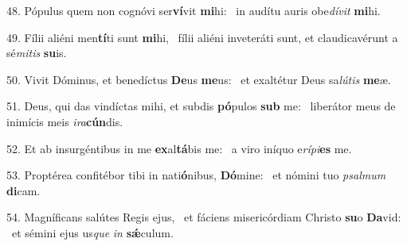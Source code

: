 48. Pópulus quem non cognóvi ser\textbf{ví}vit \textbf{mi}hi: \ast\  in audítu auris obe\textit{dí}\textit{vit} \textbf{mi}hi.\

49. Fílii aliéni men\textbf{tí}ti sunt \textbf{mi}hi, \ast\  fílii aliéni inveteráti sunt, et claudicavérunt a sé\textit{mi}\textit{tis} \textbf{su}is.\

50. Vivit Dóminus, et benedíctus \textbf{De}us \textbf{me}us: \ast\  et exaltétur Deus sa\textit{lú}\textit{tis} \textbf{me}æ.\

51. Deus, qui das vindíctas mihi, et subdis \textbf{pó}pulos \textbf{sub} me: \ast\  liberátor meus de inimícis meis \textit{i}\textit{ra}\textbf{cún}dis.\

52. Et ab insurgéntibus in me \textbf{ex}al\textbf{tá}bis me: \ast\  a viro iníquo e\textit{rí}\textit{pi}\textbf{es} me.\

53. Proptérea confitébor tibi in nati\textbf{ó}nibus, \textbf{Dó}mine: \ast\  et nómini tuo \textit{psal}\textit{mum} \textbf{di}cam.\

54. Magníficans salútes Regis ejus, \dag\  et fáciens misericórdiam Christo \textbf{su}o \textbf{Da}vid: \ast\  et sémini ejus us\textit{que} \textit{in} \textbf{sǽ}culum.\

